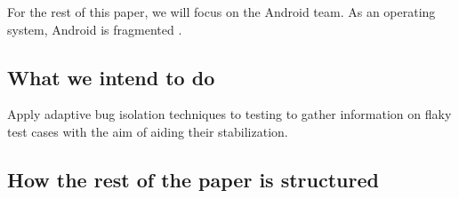 For the rest of this paper, we will focus on the Android team. As an operating system, Android is fragmented .

\subsection{What we intend to do}

Apply adaptive bug isolation techniques to testing to gather information on flaky test cases with the aim of aiding their stabilization.

\subsection{How the rest of the paper is structured}